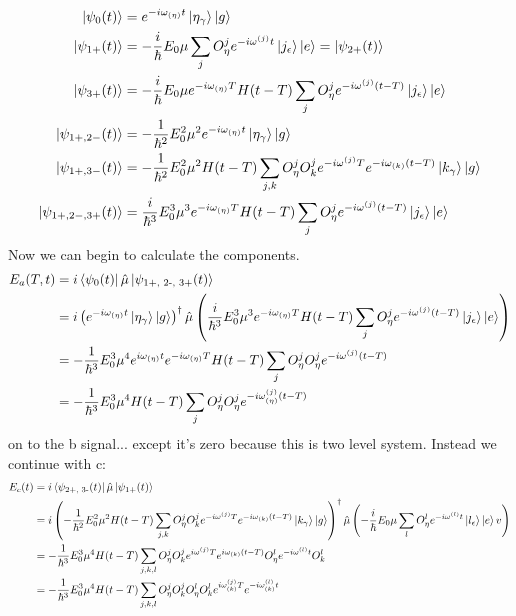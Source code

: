 \begin{align}
	\ket{\psi_{0} (t)} &= e^{-i \omega_{(\eta)}t} \ket{\eta_{\gamma}} \ket{g} \\
	\ket{\psi_{1+}(t)} &= -\frac{i}{\hbar} E_0 \mu  \sum_{j} O_{\eta}^{j} e^{-i \omega^{(j)} t } \ket{j_{\epsilon}} \ket{e} = \ket{\psi_{2+}(t)}   \\
	\ket{\psi_{3+}(t)} &= -\frac{i}{\hbar} E_0 \mu  e^{-i \omega_{(\eta)}T} H(t-T) \sum_{j}  O_{\eta}^{j}  e^{-i \omega^{(j)} (t - T) } \ket{j_{\epsilon}} \ket{e} \\
	\ket{\psi_{1+,2-}(t)} &= -\frac{1}{\hbar^2} E^2_0 \mu^2 e^{-i \omega_{(\eta)}t}  \ket{\eta_{\gamma}} \ket{g}\\
	\ket{\psi_{1+,3-}(t)} &= -\frac{1}{\hbar^2} E^2_0 \mu^2 H(t-T) \sum_{j, k} O_{\eta}^{j} O_{k}^{j} e^{-i \omega^{(j)} T } e^{-i \omega_{(k)} (t - T) } \ket{k_{\gamma}} \ket{g}  \\
	\ket{\psi_{1+,2-, 3+}(t)} &= \frac{i}{\hbar^3} E^3_0 \mu^3 e^{-i \omega_{(\eta)}T} H(t-T) \sum_{j}  O_{\eta}^{j}  e^{-i \omega^{(j)} (t - T) } \ket{j_{\epsilon}} \ket{e}
\end{align}
Now we can begin to calculate the components.
\begin{align}
	E_a (T, t) &= i \bra{\psi_{0} (t)} \hat{\mu} \ket{\psi_{\text{1+, 2-, 3+}} (t)}\\
	&=  i \left( e^{-i \omega_{(\eta)}t} \ket{\eta_{\gamma}} \ket{g}   \right)^{\dagger} \hat{\mu} \left(  \frac{i}{\hbar^3} E^3_0 \mu^3 e^{-i \omega_{(\eta)}T} H(t-T) \sum_{j}  O_{\eta}^{j}  e^{-i \omega^{(j)} (t - T) } \ket{j_{\epsilon}} \ket{e}  \right) \\
	&=  -\frac{1}{\hbar^3} E^3_0 \mu^4 e^{i \omega_{(\eta)}t}    e^{-i \omega_{(\eta)}T}   H(t-T) \sum_{j}  O_{\eta}^{j} O_{\eta}^{j}  e^{-i \omega^{(j)} (t - T) } \\
	&=  -\frac{1}{\hbar^3} E^3_0 \mu^4  H(t-T) \sum_{j}  O_{\eta}^{j} O_{\eta}^{j}  e^{-i \omega^{(j)}_{(\eta)} (t - T) }
\end{align}
on to the b signal... except it's zero because this is two level system.  Instead we continue with c:
\begin{align}
	E_c (t) &=  i \bra{\psi_{\text{2+, 3-}} (t)} \hat{\mu} \ket{\psi_{\text{1+}} (t)}\\
	&=  i \left(   -\frac{1}{\hbar^2} E^2_0 \mu^2 H(t-T) \sum_{j, k} O_{\eta}^{j} O_{k}^{j} e^{-i \omega^{(j)} T } e^{-i \omega_{(k)} (t - T) } \ket{k_{\gamma}} \ket{g} \right)^{\dagger} \hat{\mu} \left( -\frac{i}{\hbar} E_0 \mu  \sum_{l} O_{\eta}^{l} e^{-i \omega^{(l)} t } \ket{l_{\epsilon}} \ket{e} v \right) \\
	&=  -\frac{1}{\hbar^3} E^3_0 \mu^4 H(t-T) \sum_{j,k,l}O_{\eta}^{j} O_{k}^{j} e^{i \omega^{(j)} T } e^{i \omega_{(k)} (t - T) } O_{\eta}^{l} e^{-i \omega^{(l)} t } O_{k}^{l}\\
	&=  -\frac{1}{\hbar^3} E^3_0 \mu^4 H(t-T) \sum_{j,k,l}O_{\eta}^{j} O_{k}^{j} O_{\eta}^{l} O_{k}^{l}  e^{i \omega^{(j)}_{(k)} T }  e^{-i \omega^{(l)}_{(k)} t }
\end{align}

